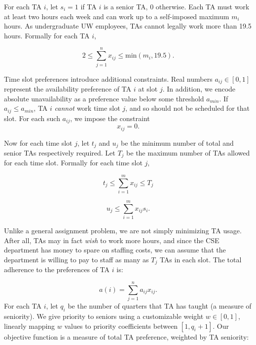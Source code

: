\documentclass{article}
\begin{document}
\begin{multicols}{2}
For each TA $i$, let $s_i = 1$ if TA $i$ is a senior TA, 0 otherwise. Each TA must work at least two hours each week and can work up to a self-imposed maximum $m_i$ hours. As undergraduate UW employees, TAs cannot legally work more than 19.5 hours. Formally for each TA $i$,

\begin{equation}
2 \leq \sum_{j=1}^{n}x_{ij} \leq \textrm{min}(m_i, 19.5).
\end{equation}

Time slot preferences introduce additional constraints. Real numbers $a_{ij} \in [0,1]$ represent the availability preference of TA $i$ at slot $j$. In addition, we encode absolute unavailability as a preference value below some threshold $a_{min}$. If $a_{ij} \leq a_{min}$, TA $i$ \textit{cannot} work time slot $j$, and so should not be scheduled for that slot. For each such $a_{ij}$, we impose the constraint
\begin{equation}
x_{ij} = 0.
\end{equation}

Now for each time slot $j$, let $t_j$ and $u_j$ be the minimum number of total and senior TAs respectively required. Let $T_j$ be the maximum number of TAs allowed for each time slot. Formally for each time slot $j$,

\begin{equation}
t_j \leq \sum_{i=1}^{m}x_{ij} \leq T_j
\end{equation}

\begin{equation}
u_j \leq \sum_{i=1}^{m}x_{ij}s_i.
\end{equation}

Unlike a general assignment problem, we are not simply minimizing TA usage. After all, TAs may in fact \textit{wish} to work more hours, and since the CSE department has money to spare on staffing costs, we can assume that the department is willing to pay to staff as many as $T_j$ TAs in each slot. The total adherence to the preferences of TA $i$ is:

\begin{equation}
a(i) = \sum_{j=1}^na_{ij}x_{ij}.
\end{equation}
For each TA $i$, let $q_i$ be the number of quarters that TA has taught (a measure of seniority). We give priority to seniors using a customizable weight $w \in [0,1]$, linearly mapping $w$ values to priority coefficients between $[1, q_i + 1]$. Our objective function is a measure of total TA preference, weighted by TA seniority:


\end{multicols}
\end{document}
